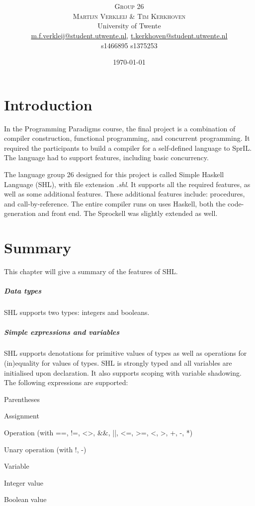 \documentclass[twoside]{report}
\title{\vspace{-15mm}\fontsize{24pt}{10pt}\selectfont\textbf{\articletitle}} %
\author{
\large
\textsc{Group 26}\\[-0.75mm]
\textsc{Martijn Verkleij \& Tim Kerkhoven}\\[2mm] %
\normalsize University of Twente \\ %
\normalsize \href{mailto:m.f.verkleij@student.utwente.nl}{m.f.verkleij@student.utwente.nl},
\href{mailto:t.kerkhoven@student.utwente.nl}{t.kerkhoven@student.utwente.nl}\\%
\normalsize s1466895 s1375253
}
\date{\today}
\begin{document}
\thispagestyle{empty}
\maketitle %



\tableofcontents


\chapter{Introduction}
\label{introduction}
In the Programming Paradigms course, the final project is a combination of compiler construction, functional programming, and concurrent programming. It required the participants to build a compiler for a self-defined language to SprIL. The language had to support features, including basic concurrency.

The language group 26 designed for this project is called Simple Haskell Language (SHL), with file extension \emph{.shl}. It supports all the required features, as well as some additional features. These additional features include: procedures, and call-by-reference. The entire compiler runs on uses Haskell, both the code-generation and front end. The Sprockell was slightly extended as well.


\chapter{Summary}
\label{summary}
This chapter will give a summary of the features of SHL. 
\paragraph{Data types} SHL supports two types: integers and booleans. 
\paragraph{Simple expressions and variables} SHL supports denotations for primitive values of types as well as operations for (in)equality for values of types. SHL is strongly typed and all variables are initialised upon declaration. It also supports scoping with variable shadowing. The following expressions are supported:
\begin{compactitem}
	\item Parentheses
	\item Assignment
	\item Operation (with ==, !=, <>, \&\&, ||, <=, >=, <, >, +, -, *)
	\item Unary operation (with !, -)
	\item Variable
	\item Integer value
	\item Boolean value
\end{compactitem}
\end{document}
